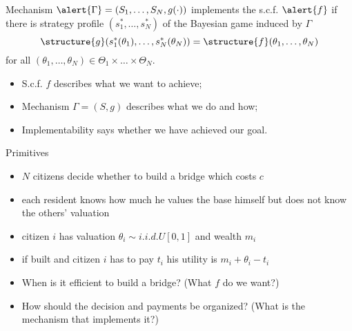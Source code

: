 \documentclass[english,handout,10pt]{beamer}		%
\def\lyxframeend{} %
\begin{document}
\begin{definition}[implementation]
	Mechanism $\alert{\Gamma}=(S_{1},\dots,S_{N},g(\cdot))$ \alert{implements} the s.c.f. $\alert{f}$ if there is  strategy profile $(s_{1}^{*},\dots,s_{N}^{*})$ of the Bayesian game induced by $\Gamma$  
	$$\structure{g}(s_{1}^{*}(\theta_{1}),\dots,s_{N}^{*}(\theta_{N})) = \structure{f} (\theta_{1},\dots,\theta_{N})$$ 
	for all $(\theta_{1},\dots,\theta_{N})\in\Theta_{1}\times\dots \times\Theta_{N}$.
\end{definition}
\lyxframeend


\begin{itemize}
	\item S.c.f. $f$ describes what we want to achieve;
	\item Mechanism $\Gamma = (S,g)$ describes what we do and how;
	\item Implementability says whether we have achieved our goal.
\end{itemize}
\lyxframeend


\begin{exampleblock}{Primitives}
	\begin{itemize}
		\item $N$ citizens decide whether to build a bridge which costs $c$
		\item each resident knows how much he values the base himself but does not know the others' valuation
		\item citizen $i$ has valuation $\theta_{i} \sim i.i.d.U[0,1]$ and wealth $m_{i}$
		\item if built and citizen $i$ has to pay $t_{i}$ his utility is $m_{i}+\theta_{i}-t_{i}$
	\end{itemize}
\end{exampleblock}
\begin{itemize}
	\item When is it efficient to build a bridge? (What $f$ do we want?)
	\item How should the decision and payments be organized? (What is the mechanism that implements it?)
\end{itemize}
\lyxframeend
\end{document}
